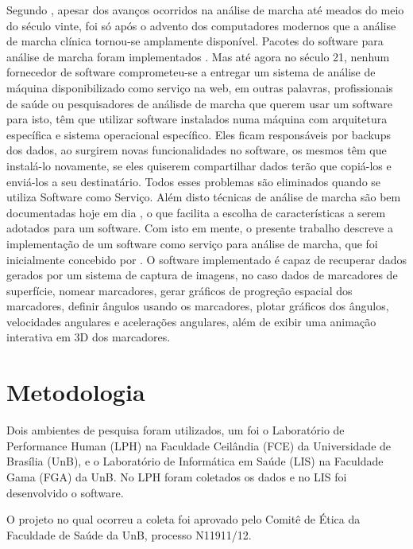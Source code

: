\documentclass[journal]{IEEEtran}
\begin{document}
Segundo \cite{Baker2007}, apesar dos avanços ocorridos na análise de marcha 
até meados do meio do século
vinte, foi só após o advento dos computadores modernos 
que a análise de marcha clínica
tornou-se amplamente disponível. Pacotes do software para análise de marcha foram
implementados \cite{Moraes2003}.
Mas até agora no século 21, nenhum fornecedor de software comprometeu-se
a
entregar um sistema de análise de máquina disponibilizado como serviço na web,
em outras palavras, profissionais de saúde ou pesquisadores de análisde de marcha
que querem usar um software para isto, têm que utilizar software instalados
numa máquina com arquitetura específica e sistema operacional específico. 
Eles ficam responsáveis por backups dos dados,
ao surgirem novas funcionalidades no software, os mesmos têm que instalá-lo
novamente, se eles quiserem compartilhar dados terão que copiá-los e enviá-los
a seu destinatário. 
Todos esses problemas são eliminados quando se utiliza Software como Serviço.
Além disto técnicas de análise de marcha são bem documentadas hoje em dia
\cite{Perry2010} \cite{Skinner2007} \cite{Ferreira2009}, o que facilita a escolha de características a serem adotados
para um software.
Com isto em mente, o presente trabalho descreve a implementação
de um software como serviço para análise de marcha, que foi
inicialmente concebido por \cite{Lima2015}. 
O software implementado é capaz de recuperar dados gerados por um sistema de
captura de imagens, no caso dados de  marcadores de superfície, 
nomear marcadores,
gerar gráficos de progreção espacial dos marcadores, 
definir ângulos usando os marcadores, plotar gráficos dos ângulos, 
velocidades angulares e acelerações angulares, além de exibir uma animação
interativa em 3D dos marcadores.


\section{Metodologia}
Dois ambientes de pesquisa foram utilizados, um foi o Laboratório de 
Performance Human (LPH) na Faculdade Ceilândia (FCE) 
da Universidade de Brasília (UnB), e o Laboratório de Informática em Saúde
(LIS) na Faculdade Gama (FGA) da UnB.
No LPH foram coletados os dados e no LIS foi desenvolvido o software.

O projeto no qual ocorreu a coleta foi aprovado pelo Comitê de Ética
da Faculdade de Saúde da UnB, processo N11911/12.
\end{document}
